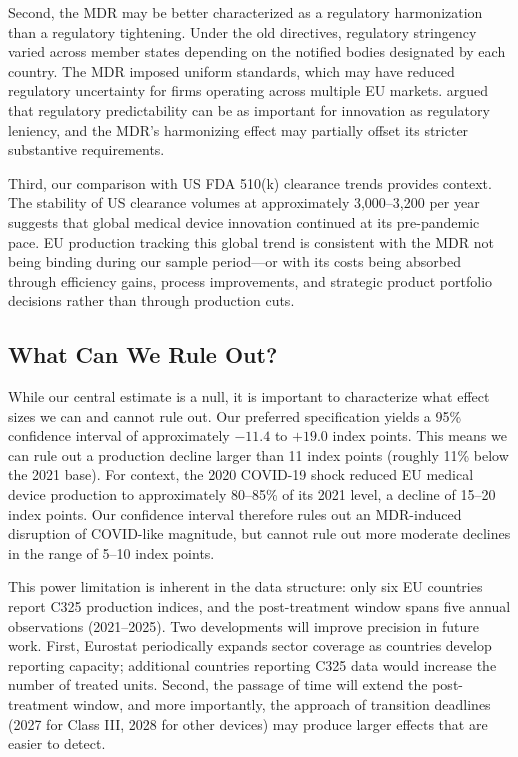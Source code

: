 \documentclass[12pt]{article}
\begin{document}
Second, the MDR may be better characterized as a regulatory harmonization than a regulatory tightening. Under the old directives, regulatory stringency varied across member states depending on the notified bodies designated by each country. The MDR imposed uniform standards, which may have reduced regulatory uncertainty for firms operating across multiple EU markets. \citet{bloom2019toolkit} argued that regulatory predictability can be as important for innovation as regulatory leniency, and the MDR's harmonizing effect may partially offset its stricter substantive requirements.

Third, our comparison with US FDA 510(k) clearance trends provides context. The stability of US clearance volumes at approximately 3,000--3,200 per year suggests that global medical device innovation continued at its pre-pandemic pace. EU production tracking this global trend is consistent with the MDR not being binding during our sample period---or with its costs being absorbed through efficiency gains, process improvements, and strategic product portfolio decisions rather than through production cuts.

\subsection{What Can We Rule Out?}

While our central estimate is a null, it is important to characterize what effect sizes we can and cannot rule out. Our preferred specification yields a 95\% confidence interval of approximately $-11.4$ to $+19.0$ index points. This means we can rule out a production decline larger than 11 index points (roughly 11\% below the 2021 base). For context, the 2020 COVID-19 shock reduced EU medical device production to approximately 80--85\% of its 2021 level, a decline of 15--20 index points. Our confidence interval therefore rules out an MDR-induced disruption of COVID-like magnitude, but cannot rule out more moderate declines in the range of 5--10 index points.

This power limitation is inherent in the data structure: only six EU countries report C325 production indices, and the post-treatment window spans five annual observations (2021--2025). Two developments will improve precision in future work. First, Eurostat periodically expands sector coverage as countries develop reporting capacity; additional countries reporting C325 data would increase the number of treated units. Second, the passage of time will extend the post-treatment window, and more importantly, the approach of transition deadlines (2027 for Class III, 2028 for other devices) may produce larger effects that are easier to detect.
\end{document}
